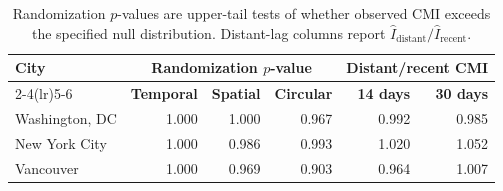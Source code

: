 
\begin{table}[H]
\caption{ Randomization
\(p\)-values are upper-tail tests of whether observed CMI exceeds the
specified null distribution. Distant-lag columns report
\(\widehat I_{\mathrm{distant}}/\widehat I_{\mathrm{recent}}\).}
\label{tab:null_calibration}
\centering
\begin{tabular*}{\linewidth}{@{\extracolsep{\fill}}lrrrrr@{}}
\toprule
\textbf{City} & \multicolumn{3}{c}{\textbf{Randomization \(p\)-value}} &
\multicolumn{2}{c}{\textbf{Distant/recent CMI}}\\
\cmidrule(lr){2-4}\cmidrule(lr){5-6}
 & \textbf{Temporal} & \textbf{Spatial} & \textbf{Circular} &
\textbf{14 days} & \textbf{30 days}\\
\midrule
Washington, DC & 1.000 & 1.000 & 0.967 & 0.992 & 0.985\\
New York City & 1.000 & 0.986 & 0.993 & 1.020 & 1.052\\
Vancouver & 1.000 & 0.969 & 0.903 & 0.964 & 1.007\\
\bottomrule
\end{tabular*}
\end{table}
